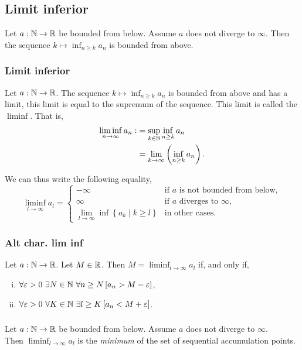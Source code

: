 \subsection{Limit inferior}
\ulem Let $a : \mathbb{N} \to \mathbb{R}$ be bounded from below. Assume $a$ does not diverge
to $\infty$. Then the sequence $k \mapsto \inf_{n \geq k} a_n$ is bounded
from above.

\subsubsection*{Limit inferior}
\udef Let $a : \mathbb{N} \to \mathbb{R}$. The sequence $k \mapsto \inf_{n \geq k} a_n$ is bounded
from above and has a limit, this limit is equal to the supremum of the sequence.
This limit is called the $\liminf$. That is,
\begin{align*}
    \liminf_{n \to \infty} a_n :&= \sup_{k \in \mathbb{N}} \inf_{n \geq k} a_n\\ 
        &= \lim_{k \to \infty} \left( \inf_{n \geq k} a_n \right).
\end{align*}

We can thus write the following equality,
\[
    \liminf_{l \to \infty} a_l = \begin{cases}
        -\infty & \text{if  $a$ is not bounded from below},\\
        \infty & \text{if $a$ diverges to $\infty$},\\
        \lim_{l \to \infty} \inf \left\{ a_k \middle| k \geq l \right\}
            & \text{in other cases}.
    \end{cases}
\]

\subsubsection*{Alt char. lim inf}
Let $a : \mathbb{N} \to \mathbb{R}$. Let $M \in \mathbb{R}$. Then $M = \liminf_{l \to \infty} a_l$ if,
and only if,
\begin{enumerate}[(i)]
    \item $\forall \varepsilon > 0\ \exists N \in \mathbb{N}\ \forall n \geq N \left[ a_n > M - \varepsilon \right]$,
    \item $\forall \varepsilon > 0\ \forall K \in \mathbb{N}\ \exists l \geq K \left[ a_n < M + \varepsilon \right]$.
\end{enumerate}

\subsubsection*{}
\uthm Let $a : \mathbb{N} \to \mathbb{R}$ be bounded from below. Assume $a$ does not diverge to
$\infty$.\\ Then $\liminf_{l \to \infty} a_l$ is the \emph{minimum} of the set
of sequential accumulation points.

